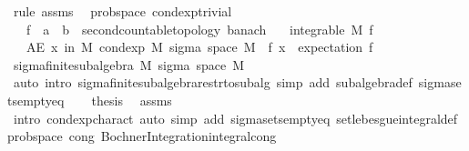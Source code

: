 \begin{isabellebody}
\isamarkupfalse%
\ {\isacharparenleft}{\kern0pt}rule\ assms{\isacharparenright}{\kern0pt}%
\endisatagproof
{\isafoldproof}%
%
\isadelimproof
\isanewline
%
\endisadelimproof
\isanewline
{}\isamarkupfalse%
\ {\isacharparenleft}{\kern0pt}\ prob{\isacharunderscore}{\kern0pt}space{\isacharparenright}{\kern0pt}\ cond{\isacharunderscore}{\kern0pt}exp{\isacharunderscore}{\kern0pt}trivial{\isacharcolon}{\kern0pt}\isanewline
\ \ \ f\ {\isacharcolon}{\kern0pt}{\isacharcolon}{\kern0pt}\ {\isachardoublequoteopen}{\isacharprime}{\kern0pt}a\ {\isasymRightarrow}\ {\isacharprime}{\kern0pt}b\ {\isacharcolon}{\kern0pt}{\isacharcolon}{\kern0pt}\ {\isacharbraceleft}{\kern0pt}second{\isacharunderscore}{\kern0pt}countable{\isacharunderscore}{\kern0pt}topology{\isacharcomma}{\kern0pt}\ banach{\isacharbraceright}{\kern0pt}{\isachardoublequoteclose}\isanewline
\ \ \ {\isachardoublequoteopen}integrable\ M\ f{\isachardoublequoteclose}\isanewline
\ \ \ {\isachardoublequoteopen}AE\ x\ in\ M{\isachardot}{\kern0pt}\ cond{\isacharunderscore}{\kern0pt}exp\ M\ {\isacharparenleft}{\kern0pt}sigma\ {\isacharparenleft}{\kern0pt}space\ M{\isacharparenright}{\kern0pt}\ {\isacharbraceleft}{\kern0pt}{\isacharbraceright}{\kern0pt}{\isacharparenright}{\kern0pt}\ f\ x\ {\isacharequal}{\kern0pt}\ expectation\ f{\isachardoublequoteclose}\isanewline
%
\isadelimproof
%
\endisadelimproof
%
\isatagproof
{}\isamarkupfalse%
\ {\isacharminus}{\kern0pt}\isanewline
\ \ \isamarkupfalse%
\ sigma{\isacharunderscore}{\kern0pt}finite{\isacharunderscore}{\kern0pt}subalgebra\ M\ {\isachardoublequoteopen}sigma\ {\isacharparenleft}{\kern0pt}space\ M{\isacharparenright}{\kern0pt}\ {\isacharbraceleft}{\kern0pt}{\isacharbraceright}{\kern0pt}{\isachardoublequoteclose}\ \isamarkupfalse%
\ {\isacharparenleft}{\kern0pt}auto\ intro{\isacharcolon}{\kern0pt}\ sigma{\isacharunderscore}{\kern0pt}finite{\isacharunderscore}{\kern0pt}subalgebra{\isacharunderscore}{\kern0pt}restr{\isacharunderscore}{\kern0pt}to{\isacharunderscore}{\kern0pt}subalg\ simp\ add{\isacharcolon}{\kern0pt}\ subalgebra{\isacharunderscore}{\kern0pt}def\ sigma{\isacharunderscore}{\kern0pt}sets{\isacharunderscore}{\kern0pt}empty{\isacharunderscore}{\kern0pt}eq{\isacharparenright}{\kern0pt}\isanewline
\ \ \isamarkupfalse%
\ {\isacharquery}{\kern0pt}thesis\ \isamarkupfalse%
\ assms\ \isamarkupfalse%
\ {\isacharparenleft}{\kern0pt}intro\ cond{\isacharunderscore}{\kern0pt}exp{\isacharunderscore}{\kern0pt}charact{\isacharparenright}{\kern0pt}\ {\isacharparenleft}{\kern0pt}auto\ simp\ add{\isacharcolon}{\kern0pt}\ sigma{\isacharunderscore}{\kern0pt}sets{\isacharunderscore}{\kern0pt}empty{\isacharunderscore}{\kern0pt}eq\ set{\isacharunderscore}{\kern0pt}lebesgue{\isacharunderscore}{\kern0pt}integral{\isacharunderscore}{\kern0pt}def\ prob{\isacharunderscore}{\kern0pt}space\ cong{\isacharcolon}{\kern0pt}\ Bochner{\isacharunderscore}{\kern0pt}Integration{\isachardot}{\kern0pt}integral{\isacharunderscore}{\kern0pt}cong{\isacharparenright}{\kern0pt}\isanewline

\end{isabellebody}
